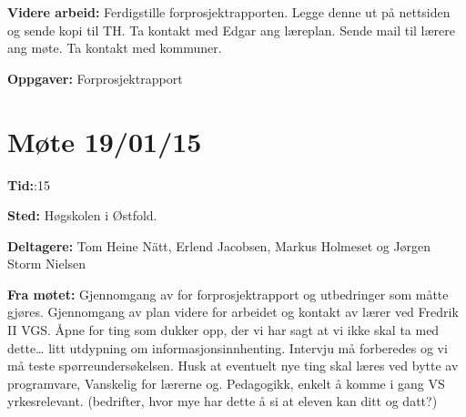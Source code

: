 \vspace{20pt}

\hspace{-17pt}\textbf{Videre arbeid:}\newline
Ferdigstille forprosjektrapporten. Legge denne ut på nettsiden og sende kopi til TH.\newline
Ta kontakt med Edgar ang læreplan. \newline
Sende mail til lærere ang møte. \newline
Ta kontakt med kommuner. \newline

\vspace{20pt}

\hspace{-17pt}\textbf{Oppgaver:}\newline
Forprosjektrapport\newline
\newpage



\section{Møte 19/01/15}

\vspace{30pt}
\textbf{Tid:}:15\newline

\hspace{-17pt}\textbf{Sted:}\newline 
Høgskolen i Østfold.\newline

\hspace{-17pt}\textbf{Deltagere:}\newline 
Tom Heine Nätt, Erlend Jacobsen, Markus Holmeset og Jørgen Storm Nielsen\newline

\hspace{-17pt}\textbf{Fra møtet:}\newline
Gjennomgang av for forprosjektrapport og utbedringer som måtte gjøres.\newline
Gjennomgang av plan videre for arbeidet og kontakt av lærer ved Fredrik II VGS.\newline
Åpne for ting som dukker opp, der vi har sagt at vi ikke skal ta med dette… \newline
litt utdypning om informasjonsinnhenting.\newline
Intervju må forberedes og vi må teste spørreundersøkelsen.\newline
Husk at eventuelt nye ting skal læres ved bytte av programvare, Vanskelig for lærerne og.\newline
Pedagogikk, enkelt å komme i gang VS yrkesrelevant. (bedrifter, hvor mye har dette å si at eleven kan ditt og datt?)\newline


